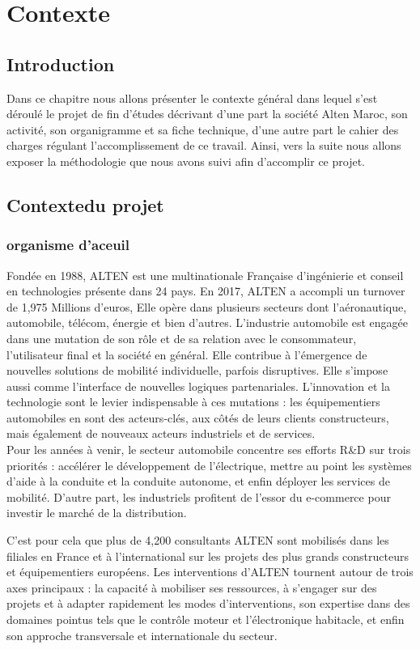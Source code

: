 \chapter{Contexte}
\pagebreak
\section*{Introduction}
Dans ce chapitre nous allons présenter le contexte général dans lequel s’est déroulé le projet de fin d’études décrivant d’une part la société Alten Maroc, son activité, son organigramme et sa fiche technique, d’une autre part le cahier des charges régulant l’accomplissement de ce travail. Ainsi, vers la suite nous allons exposer la méthodologie que nous avons suivi afin d’accomplir ce projet.
\section{Contextedu projet}
\subsection{organisme d'aceuil}
Fondée en 1988, ALTEN est une multinationale Française d’ingénierie et conseil en technologies présente dans 24 pays. En 2017, ALTEN a accompli un turnover de 1,975 Millions d’euros, Elle opère dans plusieurs secteurs dont l’aéronautique, automobile, télécom, énergie et bien d’autres. 
L’industrie automobile est engagée dans une mutation de son rôle et de sa relation avec le consommateur, l’utilisateur final et la société en général. Elle contribue à l’émergence de nouvelles solutions de mobilité individuelle, parfois disruptives. Elle s’impose aussi comme l’interface de nouvelles logiques partenariales. L’innovation et la technologie sont le levier indispensable à ces mutations : les équipementiers automobiles en sont des acteurs-clés, aux côtés de leurs clients constructeurs, mais également de nouveaux acteurs industriels et de services.\\
Pour les années à venir, le secteur automobile concentre ses efforts R\&D sur trois priorités : accélérer le développement de l’électrique, mettre au point les systèmes d’aide à la conduite et la conduite autonome, et enfin déployer les services de mobilité. D’autre part, les industriels profitent de l’essor du e-commerce pour investir le marché de la distribution.
\par
C’est pour cela que plus de 4,200 consultants ALTEN sont mobilisés dans les filiales en France et à l’international sur les projets des plus grands constructeurs et équipementiers européens. Les interventions d’ALTEN tournent autour de trois axes principaux : la capacité à mobiliser ses ressources, à s’engager sur des projets et à adapter rapidement les modes d’interventions, son expertise dans des domaines pointus tels que le contrôle moteur et l’électronique habitacle, et enfin son approche transversale et internationale du secteur.\par

